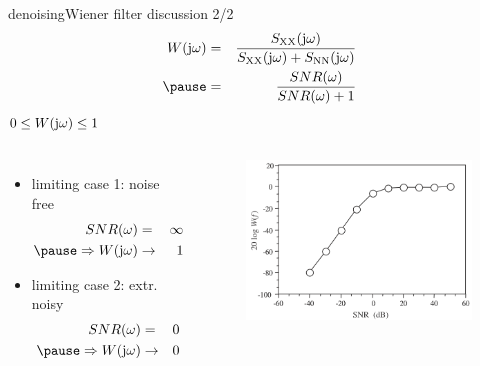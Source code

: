 	\begin{frame}{denoising}{Wiener filter discussion 2/2}
      \vspace{-3mm} \begin{eqnarray*}
            W(\jom) &=& \frac{S_\mathrm{XX}(\jom)}{{S}_\mathrm{XX}(\jom) + {S}_\mathrm{NN}(\jom)}\\
            \pause
            &=& \frac{SNR(\omega)}{SNR(\omega) + 1}
        \end{eqnarray*}
        \smallskip
        $0\leq W(\mathrm{j}\omega)\leq 1$
        
        \begin{columns}
        \begin{itemize}
            \item   limiting case 1: noise free
                \begin{eqnarray*}
                    SNR(\omega) &=& \infty\\
                    \pause
                    \Rightarrow  
                    W(\jom) &\rightarrow & 1
                \end{eqnarray*}
            \item   limiting case 2: extr. noisy
                \begin{eqnarray*}
                    SNR(\omega) &=& 0\\
                    \pause
                    \Rightarrow  
                    W(\jom) &\rightarrow & 0
                \end{eqnarray*}
        \end{itemize}
        \begin{figure}
            \includegraphics[scale=.3]{graph/WienerSNR}
        \end{figure}
        \end{columns}
 	\end{frame}

